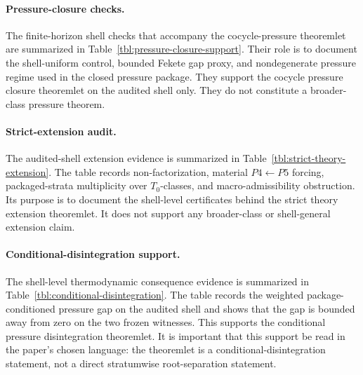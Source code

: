 \documentclass[11pt]{article}
\theoremstyle{definition}
\newcommand{\Tzero}{T_0}
\begin{document}
\paragraph{Pressure-closure checks.}
The finite-horizon shell checks that accompany the cocycle-pressure theoremlet are summarized in Table~\ref{tbl:pressure-closure-support}. Their role is to document the shell-uniform control, bounded Fekete gap proxy, and nondegenerate pressure regime used in the closed pressure package. They support the cocycle pressure closure theoremlet on the audited shell only. They do not constitute a broader-class pressure theorem.

\paragraph{Strict-extension audit.}
The audited-shell extension evidence is summarized in Table~\ref{tbl:strict-theory-extension}. The table records non-factorization, material \(P4\leftarrow P5\) forcing, packaged-strata multiplicity over \(\Tzero\)-classes, and macro-admissibility obstruction. Its purpose is to document the shell-level certificates behind the strict theory extension theoremlet. It does not support any broader-class or shell-general extension claim.

\paragraph{Conditional-disintegration support.}
The shell-level thermodynamic consequence evidence is summarized in Table~\ref{tbl:conditional-disintegration}. The table records the weighted package-conditioned pressure gap on the audited shell and shows that the gap is bounded away from zero on the two frozen witnesses. This supports the conditional pressure disintegration theoremlet. It is important that this support be read in the paper’s chosen language: the theoremlet is a conditional-disintegration statement, not a direct stratumwise root-separation statement.
\end{document}
